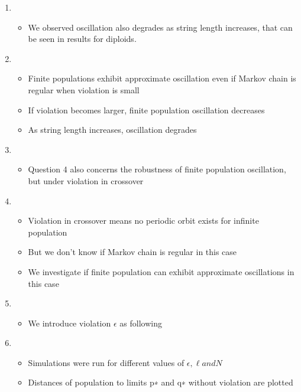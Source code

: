 \documentclass{article}
\begin{document}
\begin{enumerate}
\begin{itemize}
  \end{itemize}
  
\item
  \begin{itemize}
  \item We observed oscillation also degrades as string length increases, that can be seen in results for diploids.
  
  \end{itemize}
  
\item
  \begin{itemize}
  \item Finite populations exhibit approximate oscillation even if Markov chain is regular when violation is small
  \item If violation becomes larger, finite population oscillation decreases
  \item As string length increases, oscillation degrades
  \end{itemize}
  
\item
  \begin{itemize}
  \item Question 4 also concerns the robustness of finite population oscillation, but under violation in crossover
  
  \end{itemize}

\item
  \begin{itemize}
  \item Violation in crossover means no periodic orbit exists for infinite population
  \item But we don't know if Markov chain is regular in this case
  \item We investigate if finite population can exhibit approximate oscillations in this case  
   
  \end{itemize}
  
\item
  \begin{itemize}
  \item We introduce violation $\epsilon$ as following  
  \end{itemize}
  
\item
  \begin{itemize}
  \item Simulations were run for different values of $\epsilon, \ell and N$
  \item Distances of population to limits p∗ and q∗ without violation are plotted  
  \end{itemize}
  

\end{enumerate}
\end{document}
